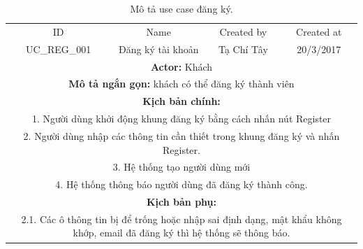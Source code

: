 \documentclass[a4paper,12pt,oneside]{article}
\begin{document}
\begin{table}[!htp]
\centering
\begin{tabularx}{\linewidth}{ |c||c|c|c| }
\hline
ID & Name & Created by & Created at\\
UC\_REG\_001 & Đăng ký tài khoản & Tạ Chí Tây & 20/3/2017\\
\hline
\multicolumn{4}{|X|}{\textbf{Actor:} Khách }\\
\hline
\multicolumn{4}{|X|}{\textbf{Mô tả ngắn gọn:} khách có thể đăng ký thành viên }\\
\hline
\multicolumn{4}{|X|}{\textbf{Kịch bản chính:}}\\
\multicolumn{4}{|X|}{1. Người dùng khởi động khung đăng ký bằng cách nhấn nút Register}\\
\multicolumn{4}{|X|}{
2.	Người dùng nhập các thông tin cần thiết trong khung đăng ký và nhấn Register.}\\
\multicolumn{4}{|X|}{
3.	Hệ thống tạo người dùng mới}\\
\multicolumn{4}{|X|}{
4.	Hệ thống thông báo người dùng đã đăng ký thành công.}\\
\hline
\multicolumn{4}{|X|}{\textbf{Kịch bản phụ:}}\\
\multicolumn{4}{|X|}{2.1. Các ô thông tin bị để trống hoặc nhập sai định dạng, mật khẩu không khớp, email đã đăng ký thì hệ thống sẽ thông báo.}\\
\hline

\end{tabularx}
\caption{Mô tả use case đăng ký.}
\end{table}
\end{document}
